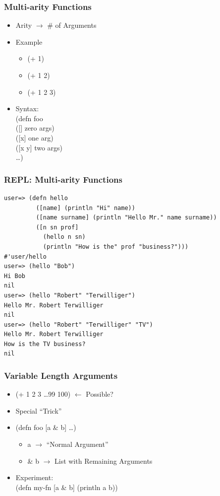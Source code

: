 \documentclass{beamer}
\begin{document}
  \begin{frame}
      \frametitle{Multi-arity Functions}

      \begin{itemize}
          \item Arity $\rightarrow$ \# of Arguments
          \item Example
              \begin{itemize}
                  \item (+ 1)
                  \item (+ 1 2)
                  \item (+ 1 2 3)
              \end{itemize}
          \item Syntax:\\ 
              (defn foo\\
              \hspace{1cm}([] zero args)\\
              \hspace{1cm}([x] one arg)\\
              \hspace{1cm}([x y] two args)\\
              \hspace{1cm}\ldots)
      \end{itemize}
  \end{frame}

\begin{frame}[fragile]
\frametitle{REPL: Multi-arity Functions}
\begin{lstlisting}[basicstyle=\scriptsize]
user=> (defn hello
         ([name] (println "Hi" name))
         ([name surname] (println "Hello Mr." name surname))
         ([n sn prof] 
           (hello n sn) 
           (println "How is the" prof "business?")))
#'user/hello
user=> (hello "Bob")
Hi Bob
nil
user=> (hello "Robert" "Terwilliger")
Hello Mr. Robert Terwilliger
nil
user=> (hello "Robert" "Terwilliger" "TV")
Hello Mr. Robert Terwilliger
How is the TV business?
nil
\end{lstlisting}
\end{frame}

  \begin{frame}
      \frametitle{Variable Length Arguments}

      \begin{itemize}
          \item (+ 1 2 3 \ldots 99 100) $\leftarrow$ Possible?
          \item Special ``Trick''
          \item (defn foo [a \& b] \ldots)
              \begin{itemize}
                  \item a $\rightarrow$ ``Normal Argument''
                  \item \& b $\rightarrow$ List with Remaining Arguments
              \end{itemize}
          \item Experiment:\\
              (defn my-fn [a \& b] (println a b))
      \end{itemize}
  \end{frame}
\end{document}
